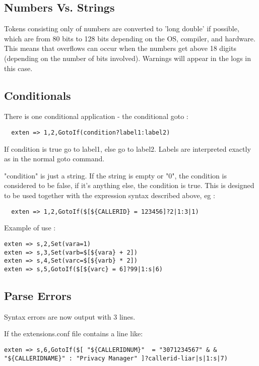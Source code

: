 \subsection{Numbers Vs. Strings}

Tokens consisting only of numbers are converted to 'long double' if possible, which
are from 80 bits to 128 bits depending on the OS, compiler, and hardware.
This means that overflows can occur when the
numbers get above 18 digits (depending on the number of bits involved).  Warnings will appear in the logs in this
case.

\subsection{Conditionals}

There is one conditional application - the conditional goto : 

\begin{verbatim}
  exten => 1,2,GotoIf(condition?label1:label2)
\end{verbatim}

If condition is true go to label1, else go to label2. Labels are interpreted
exactly as in the normal goto command.

"condition" is just a string. If the string is empty or "0", the condition
is considered to be false, if it's anything else, the condition is true. 
This is designed to be used together with the expression syntax described 
above, eg : 

\begin{verbatim}
  exten => 1,2,GotoIf($[${CALLERID} = 123456]?2|1:3|1)
\end{verbatim}

Example of use : 

\begin{verbatim}
exten => s,2,Set(vara=1)
exten => s,3,Set(varb=$[${vara} + 2])
exten => s,4,Set(varc=$[${varb} * 2])
exten => s,5,GotoIf($[${varc} = 6]?99|1:s|6)
\end{verbatim}

\subsection{Parse Errors}

Syntax errors are now output with 3 lines.

If the extensions.conf file contains a line like:

\begin{verbatim}
exten => s,6,GotoIf($[ "${CALLERIDNUM}"  = "3071234567" & &  "${CALLERIDNAME}" : "Privacy Manager" ]?callerid-liar|s|1:s|7)
\end{verbatim}

